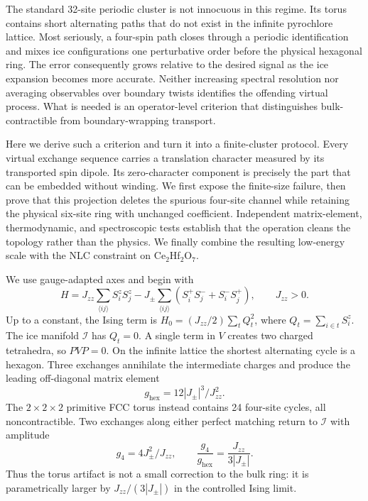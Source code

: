 \documentclass[reprint,amsmath,amssymb,aps,prl,superscriptaddress,floatfix]{revtex4-2}
\newcommand{\Jzz}{J_{zz}}
\newcommand{\Jpm}{J_{\pm}}
\newcommand{\ghex}{g_{\mathrm{hex}}}
\newcommand{\gfour}{g_4}
\newcommand{\ice}{\mathcal I}
\begin{document}
The standard 32-site periodic cluster is not innocuous in this regime.  Its
torus contains short alternating paths that do not exist in the infinite
pyrochlore lattice.  Most seriously, a four-spin path closes through a
periodic identification and mixes ice configurations one perturbative order
before the physical hexagonal ring.  The error consequently grows relative
to the desired signal as the ice expansion becomes more accurate.  Neither
increasing spectral resolution nor averaging observables over boundary
twists identifies the offending virtual process.  What is needed is an
operator-level criterion that distinguishes bulk-contractible from
boundary-wrapping transport.

Here we derive such a criterion and turn it into a finite-cluster protocol.
Every virtual exchange sequence carries a translation character measured by
its transported spin dipole.  Its zero-character component is precisely the
part that can be embedded without winding.  We first expose the finite-size
failure, then prove that this projection deletes the spurious four-site
channel while retaining the physical six-site ring with unchanged
coefficient.  Independent matrix-element, thermodynamic, and spectroscopic
tests establish that the operation cleans the topology rather than the
physics.  We finally combine the resulting low-energy scale with the NLC
constraint on Ce$_2$Hf$_2$O$_7$.

We use gauge-adapted axes and begin with
\begin{equation}
 H=\Jzz\sum_{\langle ij\rangle}S_i^zS_j^z
 -\Jpm\sum_{\langle ij\rangle}(S_i^+S_j^-+S_i^-S_j^+),
 \qquad \Jzz>0 .
\label{eq:model}
\end{equation}
Up to a constant, the Ising term is
$H_0=(\Jzz/2)\sum_tQ_t^2$, where $Q_t=\sum_{i\in t}S_i^z$.  The ice manifold
$\ice$ has $Q_t=0$.  A single term in $V$ creates two charged tetrahedra, so
$PVP=0$.  On the infinite lattice the shortest alternating cycle is a
hexagon.  Three exchanges annihilate the intermediate charges and produce
the leading off-diagonal matrix element
\begin{equation}
 \ghex=12|\Jpm|^3/\Jzz^2.
\label{eq:ghex}
\end{equation}
The $2\times2\times2$ primitive FCC torus instead contains 24 four-site
cycles, all noncontractible.  Two exchanges along either perfect matching
return to $\ice$ with amplitude
\begin{equation}
 \gfour=4\Jpm^2/\Jzz,\qquad
 \frac{\gfour}{\ghex}=\frac{\Jzz}{3|\Jpm|}.
\label{eq:g4}
\end{equation}
Thus the torus artifact is not a small correction to the bulk ring: it is
parametrically larger by $\Jzz/(3|\Jpm|)$ in the controlled Ising limit.
\end{document}
